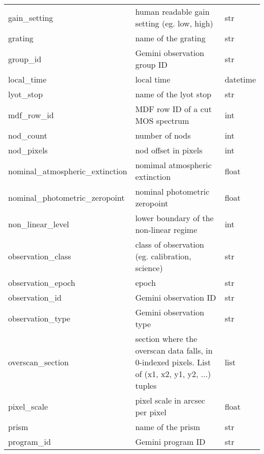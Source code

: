 \documentclass[letterpaper,10pt,english]{sphinxmanual}
\begin{document}
\begin{longtable}{|l|p{3.0in}|l|}
gain\_setting
 & 
human readable gain setting (eg. low, high)
 & 
str
\\

grating
 & 
name of the grating
 & 
str
\\

group\_id
 & 
Gemini observation group ID
 & 
str
\\

local\_time
 & 
local time
 & 
datetime
\\

lyot\_stop
 & 
name of the lyot stop
 & 
str
\\

mdf\_row\_id
 & 
MDF row ID of a cut MOS spectrum
 & 
int
\\

nod\_count
 & 
number of nods
 & 
int
\\

nod\_pixels
 & 
nod offset in pixels
 & 
int
\\

nominal\_atmospheric\_extinction
 & 
nomimal atmospheric extinction
 & 
float
\\

nominal\_photometric\_zeropoint
 & 
nominal photometric zeropoint
 & 
float
\\

non\_linear\_level
 & 
lower boundary of the non-linear regime
 & 
int
\\

observation\_class
 & 
class of observation (eg. calibration, science)
 & 
str
\\

observation\_epoch
 & 
epoch
 & 
str
\\

observation\_id
 & 
Gemini observation ID
 & 
str
\\

observation\_type
 & 
Gemini observation type
 & 
str
\\

overscan\_section
 & 
section where the overscan data falls, in 0-indexed pixels.
List of (x1, x2, y1, y2, ...) tuples
 & 
list
\\

pixel\_scale
 & 
pixel scale in arcsec per pixel
 & 
float
\\

prism
 & 
name of the prism
 & 
str
\\

program\_id
 & 
Gemini program ID
 & 
str
\\


\end{longtable}
\end{document}
